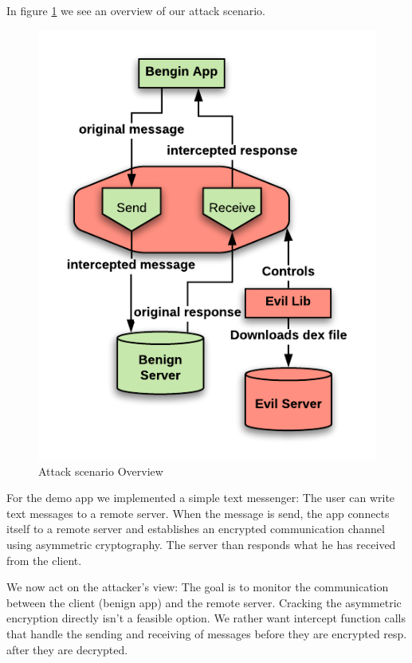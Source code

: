 In figure \ref{ModelOverview} we see an overview of our attack scenario.
\begin{figure}[H]
	\begin{center}
		\includegraphics[scale=0.45]{figures/AttackOverview.png}
	\end{center}
	\caption{Attack scenario Overview}
	\label{ModelOverview}
\end{figure}


For the demo app we implemented a simple text messenger: The user can write text messages to a remote server. When the message is send, the app connects itself to a remote server and establishes an encrypted communication channel using asymmetric cryptography. The server than responds what he has received from the client.

We now act on the attacker's view: The goal is to monitor the communication between the client (benign app) and the remote server. 
Cracking the asymmetric encryption directly isn't a feasible option. We rather want intercept function calls that handle the sending and receiving of messages before they are encrypted resp. after they are decrypted.


